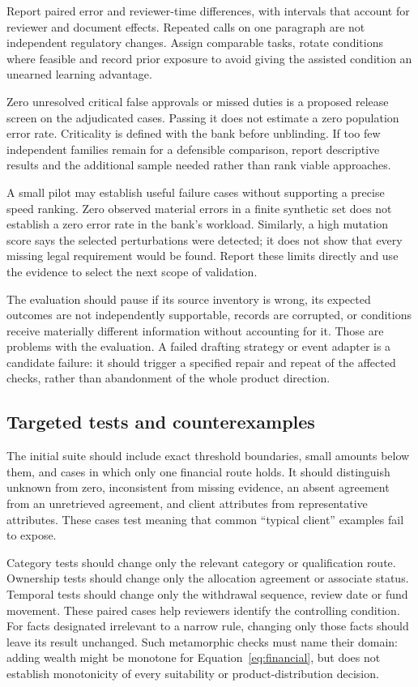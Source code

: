Report paired error and reviewer-time differences, with intervals that account
for reviewer and document effects. Repeated calls on one paragraph are not
independent regulatory changes. Assign comparable tasks, rotate conditions where
feasible and record prior exposure to avoid giving the assisted condition an
unearned learning advantage.

Zero unresolved critical false approvals or missed duties is a proposed release
screen on the adjudicated cases. Passing it does not estimate a zero population
error rate. Criticality is defined with the bank before unblinding. If too few
independent families remain for a defensible comparison, report descriptive
results and the additional sample needed rather than rank viable approaches.

A small pilot may establish useful failure cases without supporting a precise
speed ranking. Zero observed material errors in a finite synthetic set does not
establish a zero error rate in the bank's workload. Similarly, a high mutation
score says the selected perturbations were detected; it does not show that every
missing legal requirement would be found. Report these limits directly and use
the evidence to select the next scope of validation.

The evaluation should pause if its source inventory is wrong, its expected
outcomes are not independently supportable, records are corrupted, or conditions
receive materially different information without accounting for it. Those are
problems with the evaluation. A failed drafting strategy or event adapter is a
candidate failure: it should trigger a specified repair and repeat of the affected
checks, rather than abandonment of the whole product direction.

\subsection{Targeted tests and counterexamples}

The initial suite should include exact threshold boundaries, small amounts below
them, and cases in which only one financial route holds. It should distinguish
unknown from zero, inconsistent from missing evidence, an absent agreement from
an unretrieved agreement, and client attributes from representative attributes.
These cases test meaning that common ``typical client'' examples fail to expose.

Category tests should change only the relevant category or qualification route.
Ownership tests should change only the allocation agreement or associate status.
Temporal tests should change only the withdrawal sequence, review date or fund
movement. These paired cases help reviewers identify the controlling condition.
For facts designated irrelevant to a narrow rule, changing only those facts should
leave its result unchanged. Such metamorphic checks must name their domain:
adding wealth might be monotone for Equation~\eqref{eq:financial}, but does not
establish monotonicity of every suitability or product-distribution decision.

